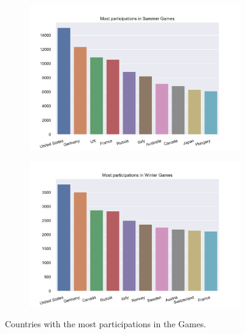 \documentclass[11pt]{article} %
\begin{document}
\begin{figure}
    \centering
    \begin{subfigure}{0.5\textwidth}
    \hspace{-17mm}
    \includegraphics[scale=0.45]{Most_part_summer_countries.pdf}
    \end{subfigure}%
    \begin{subfigure}{0.5\textwidth}
    \includegraphics[scale=0.45]{Most_part_winter_countries.pdf}
    \end{subfigure}
    \caption{Countries with the most participations in the Games.}
\end{figure}
\end{document}
